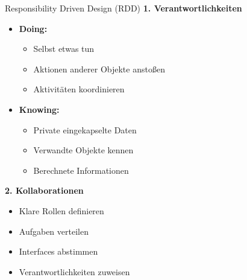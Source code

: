 \begin{KR}{Responsibility Driven Design (RDD)}
\textbf{1. Verantwortlichkeiten}
\begin{itemize}
    \item \textbf{Doing:}
    \begin{itemize}
        \item Selbst etwas tun
        \item Aktionen anderer Objekte anstoßen
        \item Aktivitäten koordinieren
    \end{itemize}
    \item \textbf{Knowing:}
    \begin{itemize}
        \item Private eingekapselte Daten
        \item Verwandte Objekte kennen
        \item Berechnete Informationen
    \end{itemize}
\end{itemize}

\textbf{2. Kollaborationen}
\begin{itemize}
    \item Klare Rollen definieren
    \item Aufgaben verteilen
    \item Interfaces abstimmen
    \item Verantwortlichkeiten zuweisen
\end{itemize}
\end{KR}

